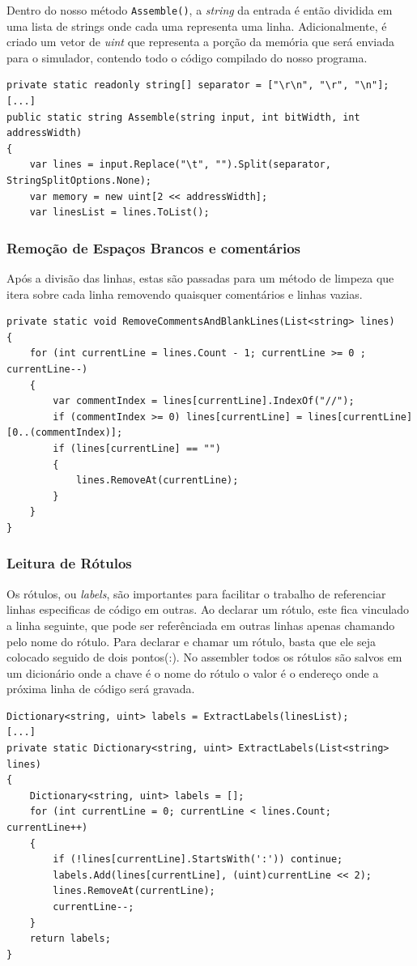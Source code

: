 \documentclass[
	article,			%
	11pt,				%
	oneside,			%
	a4paper,			%
	english,			%
	brazil,				%
	sumario=tradicional
	]{abntex2}
\begin{document}
Dentro do nosso método \texttt{Assemble()}, a \textit{string} da entrada é então dividida em uma lista de strings onde cada uma representa uma linha. Adicionalmente, é criado um vetor de \textit{uint} que representa a porção da memória que será enviada para o simulador, contendo todo o código compilado do nosso programa.

\begin{lstlisting}
private static readonly string[] separator = ["\r\n", "\r", "\n"];
[...]
public static string Assemble(string input, int bitWidth, int addressWidth)
{
    var lines = input.Replace("\t", "").Split(separator, StringSplitOptions.None);
    var memory = new uint[2 << addressWidth];
    var linesList = lines.ToList();
\end{lstlisting}

\subsubsection{Remoção de Espaços Brancos e comentários}

Após a divisão das linhas, estas são passadas para um método de limpeza que itera sobre cada linha removendo quaisquer comentários e linhas vazias.

\begin{lstlisting}
private static void RemoveCommentsAndBlankLines(List<string> lines)
{
    for (int currentLine = lines.Count - 1; currentLine >= 0 ; currentLine--)
    {
        var commentIndex = lines[currentLine].IndexOf("//");
        if (commentIndex >= 0) lines[currentLine] = lines[currentLine][0..(commentIndex)];
        if (lines[currentLine] == "")
        {
            lines.RemoveAt(currentLine);
        }
    }
}
\end{lstlisting}

\subsubsection{Leitura de Rótulos}
Os rótulos, ou \textit{labels}, são importantes para facilitar o trabalho de referenciar linhas especificas de código em outras. Ao declarar um rótulo, este fica vinculado a linha seguinte, que pode ser referênciada em outras linhas apenas chamando pelo nome do rótulo. Para declarar e chamar um rótulo, basta que ele seja colocado seguido de dois pontos(:). No assembler todos os rótulos são salvos em um dicionário onde a chave é o nome do rótulo o valor é o endereço onde a próxima linha de código será gravada.
\begin{lstlisting}
Dictionary<string, uint> labels = ExtractLabels(linesList);
[...]
private static Dictionary<string, uint> ExtractLabels(List<string> lines)
{
    Dictionary<string, uint> labels = [];
    for (int currentLine = 0; currentLine < lines.Count; currentLine++)
    {
        if (!lines[currentLine].StartsWith(':')) continue;
        labels.Add(lines[currentLine], (uint)currentLine << 2);
        lines.RemoveAt(currentLine);
        currentLine--;
    }
    return labels;
} 
\end{lstlisting}
\end{document}
